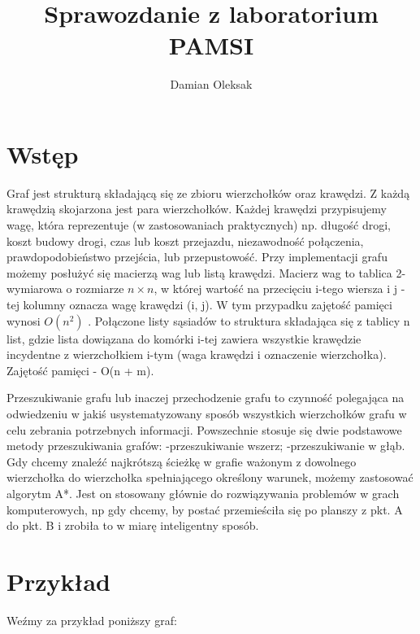 \documentclass[12pt,a4paper]{article}
\title{Sprawozdanie z laboratorium PAMSI}
\author{Damian Oleksak}
\date{}
\begin{document}
\maketitle
\newpage

\section*{Wstęp}

Graf jest strukturą składającą się ze zbioru wierzchołków oraz krawędzi. Z każdą krawędzią skojarzona jest para wierzchołków.
Każdej krawędzi przypisujemy wagę, która reprezentuje (w zastosowaniach praktycznych) np. długość drogi, koszt
budowy drogi, czas lub koszt przejazdu, niezawodność połączenia, prawdopodobieństwo przejścia, lub przepustowość. Przy implementacji grafu możemy posłużyć się macierzą wag lub listą krawędzi. Macierz wag to tablica 2-wymiarowa o rozmiarze
 $n\times n $, w której wartość na przecięciu i-tego wiersza i j -tej kolumny oznacza wagę krawędzi (i, j). W tym przypadku zajętość pamięci wynosi $ O(n^{2}) $ .
Połączone listy sąsiadów to struktura składająca się z tablicy n
list, gdzie lista dowiązana do komórki i-tej zawiera wszystkie krawędzie incydentne z wierzchołkiem i-tym (waga krawędzi i oznaczenie wierzchołka). Zajętość pamięci - O(n + m).


Przeszukiwanie grafu lub inaczej przechodzenie grafu to czynność polegająca na odwiedzeniu w jakiś usystematyzowany sposób wszystkich wierzchołków grafu w celu zebrania potrzebnych informacji. Powszechnie stosuje się dwie podstawowe metody przeszukiwania grafów:\newline
-przeszukiwanie wszerz;\newline
-przeszukiwanie w głąb.\newline
\newline
Gdy chcemy znaleźć najkrótszą ścieżkę w grafie ważonym z dowolnego wierzchołka do wierzchołka spełniającego określony warunek, możemy zastosować algorytm A*. Jest on stosowany głównie do rozwiązywania problemów w grach komputerowych, np gdy chcemy, by postać przemieściła się po planszy z pkt. A do pkt. B i zrobiła to w miarę inteligentny sposób.

\newpage

\section*{Przykład}

Weźmy za przykład poniższy graf:\newline
\end{document}
